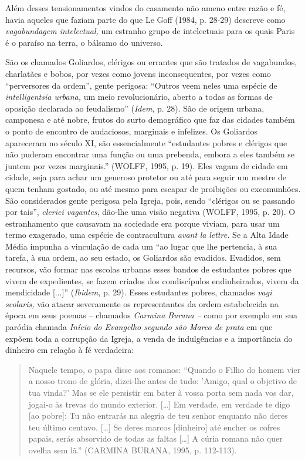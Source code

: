 Além desses tensionamentos vindos do casamento não ameno entre razão e
fé, havia aqueles que faziam parte do que Le Goff (1984, p. 28-29)
descreve como \emph{vagabundagem intelectual,} um estranho grupo de
intelectuais para os quais Paris é o paraíso na terra, o bálsamo do
universo.

São os chamados Goliardos, clérigos ou errantes que são tratados de
vagabundos, charlatães e bobos, por vezes como jovens inconsequentes,
por vezes como ``perversores da ordem'', gente perigosa: ``Outros veem
neles uma espécie de \emph{intelligentsia urbana,} um meio
revolucionário, aberto a todas as formas de oposição declarada ao
feudalismo'' (\emph{Idem}, p. 28). São de origem urbana, camponesa e até
nobre, frutos do surto demográfico que faz das cidades também o ponto de
encontro de audaciosos, marginais e infelizes. Os Goliardos apareceram
no século XI, são essencialmente ``estudantes pobres e clérigos que não
puderam encontrar uma função ou uma prebenda, embora a eles também se
juntem por vezes marginais.'' (WOLFF, 1995, p. 19). Eles vagam de cidade
em cidade, seja para achar um generoso protetor ou até para seguir um
mestre de quem tenham gostado, ou até mesmo para escapar de proibições
ou excomunhões. São considerados gente perigosa pela Igreja, pois, sendo
``clérigos ou se passando por tais'', \emph{clerici vagantes}, dão-lhe
uma visão negativa (WOLFF, 1995, p. 20). O estranhamento que causavam na
sociedade era porque viviam, para usar um termo exagerado, uma espécie
de contracultura \emph{avant} \emph{la} \emph{lettre.} Se a Alta Idade
Média impunha a vinculação de cada um ``ao lugar que lhe pertencia, à
sua tarefa, à sua ordem, ao seu estado, os Goliardos são evadidos.
Evadidos, sem recursos, vão formar nas escolas urbanas esses bandos de
estudantes pobres que vivem de expedientes, se fazem criados dos
condiscípulos endinheirados, vivem da mendicidade {[}...{]}''
(\emph{Ibidem}, p. 29). Esses estudantes pobres, chamados \emph{vagi
scolaris,} vão atacar severamente os representantes da ordem
estabelecida na época em seus poemas -- chamados \emph{Carmina}
\emph{Burana --} como por exemplo em sua paródia chamada \emph{Início do
Evangelho segundo são Marco de prata} em que expõem toda a corrupção da
Igreja, a venda de indulgências e a importância do dinheiro em relação à
fé verdadeira:

\begin{quote}
Naquele tempo, o papa disse aos romanos: ``Quando o Filho do homem vier
a nosso trono de glória, dizei-lhe antes de tudo: 'Amigo, qual o
objetivo de tua vinda?' Mas se ele persistir em bater à vossa porta sem
nada vos dar, jogai-o às trevas do mundo exterior. {[}\ldots{}{]} Em
verdade, em verdade te digo {[}ao pobre{]}: Tu não entrarás na alegria
de teu senhor enquanto não deres teu último centavo. {[}\ldots{}{]} Se
deres marcos {[}dinheiro{]} até encher os cofres papais, serás absorvido
de todas as faltas {[}\ldots{}{]} A cúria romana não quer ovelha sem
lã.'' (CARMINA BURANA, 1995, p. 112-113).
\end{quote}

